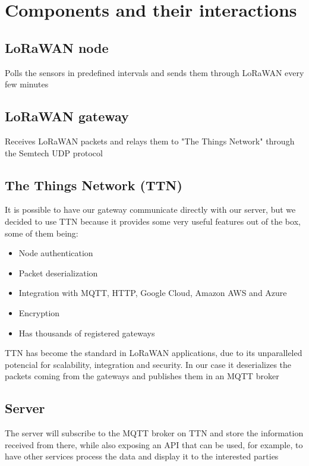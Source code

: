 \section{Components and their interactions}


	\subsection{LoRaWAN node}
		Polls the sensors in predefined intervals and sends them through LoRaWAN every few minutes

	\subsection{LoRaWAN gateway}
		Receives LoRaWAN packets and relays them to "The Things Network" through the Semtech UDP protocol

	\subsection{The Things Network (TTN)}\label{ttn_description}
		It is possible to have our gateway communicate directly with our server, but we decided to use TTN because it provides some very useful features out of the box, some of them being:

		\begin{itemize}
			\item Node authentication
			\item Packet deserialization
			\item Integration with MQTT, HTTP, Google Cloud, Amazon AWS and Azure
			\item Encryption
			\item Has thousands of registered gateways
		\end{itemize}

		TTN has become the standard in LoRaWAN applications, due to its unparalleled potencial for scalability, integration and security. In our case it deserializes the packets coming from the gateways and publishes them in an MQTT broker 

	\subsection{Server}
		The server will subscribe to the MQTT broker on TTN and store the information received from there, while also exposing an API that can be used, for example, to have other services process the data and display it to the interested parties

